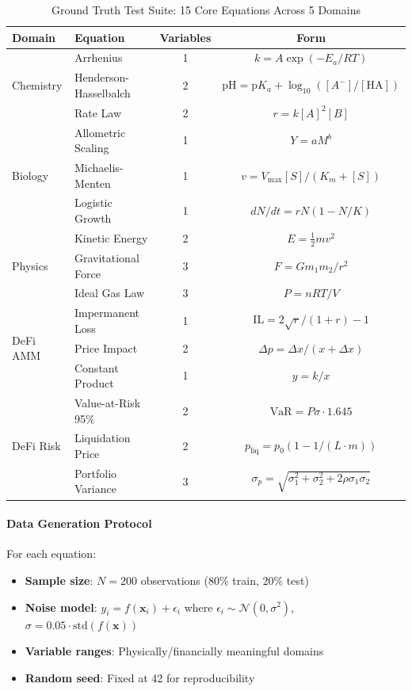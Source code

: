 \documentclass[twoside,11pt]{article}
\begin{document}
\begin{table}[htbp]
\centering
\caption{Ground Truth Test Suite: 15 Core Equations Across 5 Domains}
\label{tab:ground_truth_suite}
\small
\begin{tabular}{llcc}
\toprule
\textbf{Domain} & \textbf{Equation} & \textbf{Variables} & \textbf{Form} \\
\midrule
\multirow{3}{*}{Chemistry}
& Arrhenius & 1 & $k = A\exp(-E_a/RT)$ \\
& Henderson-Hasselbalch & 2 & $\text{pH} = \text{p}K_a + \log_{10}([A^-]/[\text{HA}])$ \\
& Rate Law & 2 & $r = k[A]^2[B]$ \\
\midrule
\multirow{3}{*}{Biology}
& Allometric Scaling & 1 & $Y = aM^b$ \\
& Michaelis-Menten & 1 & $v = V_{\max}[S]/(K_m + [S])$ \\
& Logistic Growth & 1 & $dN/dt = rN(1-N/K)$ \\
\midrule
\multirow{3}{*}{Physics}
& Kinetic Energy & 2 & $E = \frac{1}{2}mv^2$ \\
& Gravitational Force & 3 & $F = Gm_1m_2/r^2$ \\
& Ideal Gas Law & 3 & $P = nRT/V$ \\
\midrule
\multirow{3}{*}{DeFi AMM}
& Impermanent Loss & 1 & $\text{IL} = 2\sqrt{r}/(1+r) - 1$ \\
& Price Impact & 2 & $\Delta p = \Delta x/(x + \Delta x)$ \\
& Constant Product & 1 & $y = k/x$ \\
\midrule
\multirow{3}{*}{DeFi Risk}
& Value-at-Risk 95\% & 2 & $\text{VaR} = P\sigma \cdot 1.645$ \\
& Liquidation Price & 2 & $p_{\text{liq}} = p_0(1 - 1/(L \cdot m))$ \\
& Portfolio Variance & 3 & $\sigma_p = \sqrt{\sigma_1^2 + \sigma_2^2 + 2\rho\sigma_1\sigma_2}$ \\
\bottomrule
\end{tabular}
\end{table}

\paragraph{Data Generation Protocol}

For each equation:
\begin{itemize}
    \item \textbf{Sample size}: $N = 200$ observations (80\% train, 20\% test)
    \item \textbf{Noise model}: $y_i = f(\mathbf{x}_i) + \epsilon_i$ where $\epsilon_i \sim \mathcal{N}(0, \sigma^2)$, $\sigma = 0.05 \cdot \text{std}(f(\mathbf{x}))$
    \item \textbf{Variable ranges}: Physically/financially meaningful domains
    \item \textbf{Random seed}: Fixed at 42 for reproducibility
\end{itemize}
\end{document}
